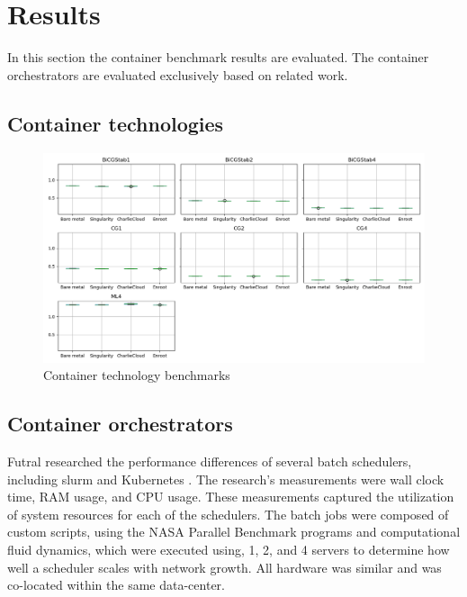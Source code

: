 \documentclass[conference]{IEEEtran}
\begin{document}
\section{Results}
In this section the container benchmark results are evaluated. The container orchestrators are evaluated exclusively based on related work.

\subsection{Container technologies}

\begin{figure}
\centering
\includegraphics[width=\textwidth]{images/container_benchmarks.png}
\caption{Container technology benchmarks}
\label{fig:container_benchmarks}
\end{figure}



\subsection{Container orchestrators}
Futral researched the performance differences of several batch schedulers, including \gls{slurm} and Kubernetes \cite{futral2019method}. The research's measurements were wall clock time, RAM usage, and CPU usage. These measurements captured the utilization of system resources for each of the schedulers. The batch jobs were composed of custom scripts, using the NASA Parallel Benchmark programs and computational fluid dynamics, which were executed using, 1, 2, and 4 servers to determine how well a scheduler scales with network growth. All hardware was similar and was co-located within the same data-center.
\end{document}
